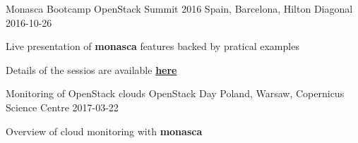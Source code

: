 
\begin{cventries}

    \cventry
    {Monasca Bootcamp}
    {OpenStack Summit 2016}
    {Spain, Barcelona, Hilton Diagonal}
    {2016-10-26}
    {
        \begin{cvitems}
            \item{Live presentation of \textbf{monasca} features backed by pratical examples}
            \item{Details of the sessios are available \href{https://www.openstack.org/summit/barcelona-2016/summit-schedule/events/15364/monasca-bootcamp}{\textbf{here}}}
        \end{cvitems}
    }

    \cventry
    {Monitoring of OpenStack clouds}
    {OpenStack Day}
    {Poland, Warsaw, Copernicus Science Centre}
    {2017-03-22}
    {
        \begin{cvitems}
            \item{Overview of cloud monitoring with \textbf{monasca}}
        \end{cvitems}
    }

\end{cventries}
